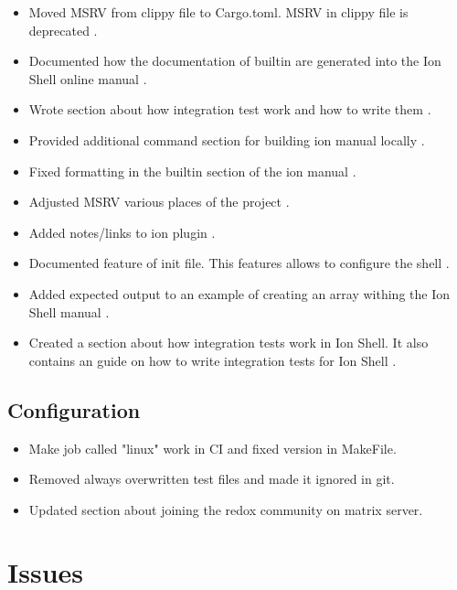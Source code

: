 \begin{itemize}
	\item Moved MSRV from clippy file to Cargo.toml. MSRV in clippy file is deprecated \cite{pr_moved_msrv_to_cargo}.
	\item Documented how the documentation of builtin are generated into the Ion Shell online manual \cite{pr_docs_how_builtin_generated}.
	\item Wrote section about how integration test work and how to write them \cite{pr_docs_section_integraion_test}.
	\item Provided additional command section for building ion manual locally \cite{pr_docs_commands_building_ion_manual}.
	\item Fixed formatting in the builtin section of the ion manual \cite{pr_docs_fix_wrong_builtin_manual_section}.
	\item Adjusted MSRV various places of the project \cite{pr_docs_adjust_msrv_project}.
	\item Added notes/links to ion plugin \cite{pr_docs_ion_plugin}.
	\item Documented feature of init file. This features allows to configure the shell \cite{pr_docs_init_file}.
	\item Added expected output to an example of creating an array withing the Ion Shell manual \cite{pr_docs_output_create_array}.
	\item Created a section about how integration tests work in Ion Shell. It also contains an guide on how to write integration tests for Ion Shell \cite{pr_docs_how_to_integration_test}.
\end{itemize}

\subsection{Configuration}

\begin{itemize}
	\item Make job called "linux" work in CI and fixed version in MakeFile. \cite{pr_conf_partial_ci_fix}
	\item Removed always overwritten test files and made it ignored in git. \cite{pr_conf_overwritten_files}
	\item Updated section about joining the redox community on matrix server. \cite{pr_docs_update_community_links}

\end{itemize}

\section{Issues}

